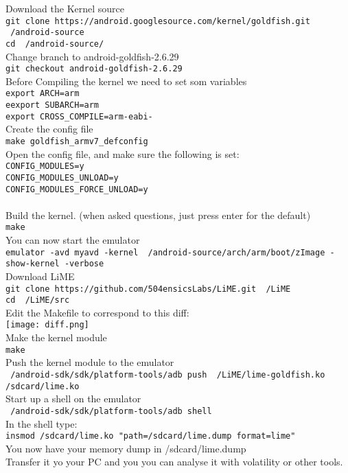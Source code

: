   Download the Kernel source\\
  \texttt{\justify git clone https://android.googlesource.com/kernel/goldfish.git ~/android-source} \\
  \texttt{\justify cd ~/android-source/} \\
  Change branch to android-goldfish-2.6.29\\
  \texttt{\justify git checkout android-goldfish-2.6.29} \\
  Before Compiling the kernel we need to set som variables\\
  \texttt{\justify export ARCH=arm} \\
  \texttt{\justify eexport SUBARCH=arm} \\
  \texttt{\justify export CROSS\_COMPILE=arm-eabi-} \\
  Create the config file\\
  \texttt{\justify make goldfish\_armv7\_defconfig} \\
  Open the config file, and make sure the following is set:\\
  \texttt{\justify CONFIG\_MODULES=y\\ CONFIG\_MODULES\_UNLOAD=y\\ CONFIG\_MODULES\_FORCE\_UNLOAD=y\\ } \\
  Build the kernel. (when asked questions, just press enter for the default)\\
  \texttt{\justify make} \\
  You can now start the emulator\\
  \texttt{\justify emulator -avd myavd -kernel ~/android-source/arch/arm/boot/zImage -show-kernel -verbose} \\
  Download LiME\\
  \texttt{\justify git clone https://github.com/504ensicsLabs/LiME.git ~/LiME} \\
  \texttt{\justify cd ~/LiME/src} \\
  Edit the Makefile to correspond to this diff:\\
  \texttt{[image: diff.png]} \\
  Make the kernel module\\
  \texttt{\justify make} \\
  Push the kernel module to the emulator\\
  \texttt{\justify ~/android-sdk/sdk/platform-tools/adb push ~/LiME/lime-goldfish.ko /sdcard/lime.ko} \\
  Start up a shell on the emulator\\
  \texttt{\justify ~/android-sdk/sdk/platform-tools/adb shell} \\
  In the shell type:\\
  \texttt{\justify insmod /sdcard/lime.ko "path=/sdcard/lime.dump format=lime"} \\
  You now have your memory dump in /sdcard/lime.dump\\
  Transfer it yo your PC and you you can analyse it with volatility or other tools.
  
  